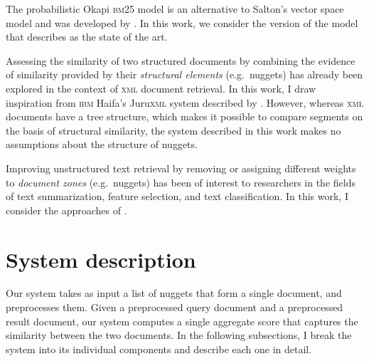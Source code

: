 \documentclass[
  digital, %
  notable, %
  lof,     %
  lot,     %
  nopalatino, color
]{fithesis3}
\newif\ifthesis\thesistrue
\def\abbr#1{\textsc{\MakeLowercase{#1}}}
\let\term\emph
\let\emph=\textit
\begin{document}
The probabilistic Okapi \abbr{BM}25\index{Okapi \abbr{BM}25} model is an alternative to Salton's vector space
model and was developed %
by \textcite{robertsonetal76,\ifthesis robertsonetal94,\fi robertsonetal95}. In this work, we consider the version of the model
that \textcite{singhal01} describes as the state of the art.

Assessing the similarity of two structured documents by combining the evidence
of similarity provided by their \term{structural elements} (e.g.\
nuggets) has already been explored in the context
of \abbr{XML}\index{XML@\abbr{XML}} document retrieval. In this work, I draw inspiration from
\abbr{IBM} Haifa's Juru\abbr{XML} system described by \textcite{massetal02}.
However, whereas \abbr{XML} documents have a tree structure, which makes it
possible to compare segments on the basis of structural similarity, the system
described in this work makes no assumptions about the structure of nuggets.

Improving unstructured text retrieval by removing or assigning different
weights to \term{document zones} (e.g.\
nuggets)\index{nugget} has been of interest to researchers in the fields of
text summarization, feature selection, and text classification. In this work, I
consider the approaches of \textcite{kolczetal00,koetal04}.

%
%
%
%
%
%
%

\section{System description}
\label{sec:segmentation-system}
Our system takes as input a list of nuggets that form a single document, and
preprocesses them. Given a preprocessed query document and a preprocessed
result document, our system computes a single aggregate score that captures the
similarity between the two documents.
In the following subsections, I break the system into its individual components
and describe each one in detail.
\end{document}

